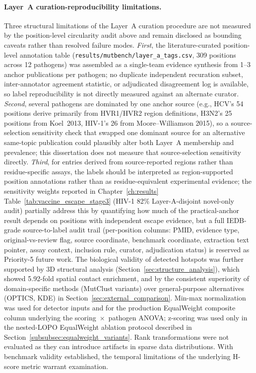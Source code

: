\paragraph{Layer~A curation-reproducibility limitations.}
Three structural limitations of the Layer~A curation procedure are not measured by the position-level circularity audit above and remain disclosed as bounding caveats rather than resolved failure modes. \emph{First}, the literature-curated position-level annotation table (\texttt{results/mutbench/layer\_a\_tags.csv}, 309 positions across 12 pathogens) was assembled as a single-team evidence synthesis from 1--3 anchor publications per pathogen; no duplicate independent recuration subset, inter-annotator agreement statistic, or adjudicated disagreement log is available, so label reproducibility is not directly measured against an alternate curator. \emph{Second}, several pathogens are dominated by one anchor source (e.g., HCV's 54 positions derive primarily from HVR1/HVR2 region definitions, H3N2's 25 positions from Koel~2013, HIV-1's 26 from Moore--Williamson 2015), so a source-selection sensitivity check that swapped one dominant source for an alternative same-topic publication could plausibly alter both Layer~A membership and prevalence; this dissertation does not measure that source-selection sensitivity directly. \emph{Third}, for entries derived from source-reported regions rather than residue-specific assays, the labels should be interpreted as region-supported position annotations rather than as residue-equivalent experimental evidence; the sensitivity weights reported in Chapter~\ref{ch:results} Table~\ref{tab:vaccine_escape_stage3} (HIV-1 82\% Layer-A-disjoint novel-only audit) partially address this by quantifying how much of the practical-anchor result depends on positions with independent escape evidence, but a full IEDB-grade source-to-label audit trail (per-position columns: PMID, evidence type, original-vs-review flag, source coordinate, benchmark coordinate, extraction text pointer, assay context, inclusion rule, curator, adjudication status) is reserved as Priority-5 future work.
The biological validity of detected hotspots was further supported by 3D structural analysis (Section~\ref{sec:structure_analysis}), which showed 5.92-fold spatial contact enrichment, and by the consistent superiority of domain-specific methods (MutClust variants) over general-purpose alternatives (OPTICS, KDE) in Section~\ref{sec:external_comparison}.
Min-max normalization was used for detector inputs and for the production EqualWeight composite column underlying the scoring~$\times$~pathogen ANOVA; z-scoring was used only in the nested-LOPO EqualWeight ablation protocol described in Section~\ref{subsubsec:equalweight_variants}. Rank transformations were not evaluated as they can introduce artifacts in sparse data distributions.
With benchmark validity established, the temporal limitations of the underlying H-score metric warrant examination.


